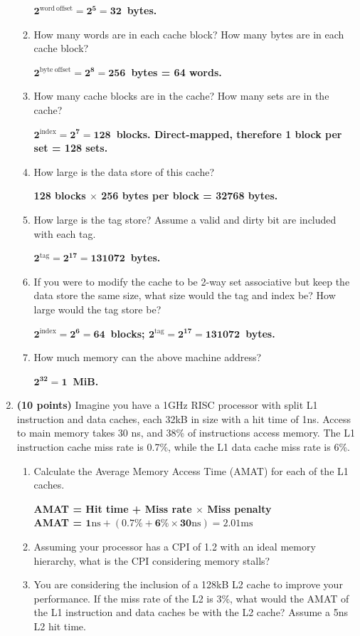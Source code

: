 \documentclass{article}
\begin{document}
\begin{enumerate}
\begin{enumerate}
\textbf{$\bm{2^{\mathrm{word\ offset}}=2^5=32}$\ bytes.}
\item How many words are in each cache block? How many bytes are in each cache block?\par
\textbf{$\bm{2^{\mathrm{byte\ offset}}=2^8=256}$\ bytes = 64 words.}
\item How many cache blocks are in the cache? How many sets are in the cache?\par
\textbf{$\bm{2^{\mathrm{index}}=2^{7}=128}$\ blocks. Direct-mapped, therefore 1 block per set = 128 sets.}
\item How large is the data store of this cache?\par
\textbf{128 blocks $\times$ 256 bytes per block = 32768 bytes.}
\item How large is the tag store? Assume a valid and dirty bit are included with each tag.\par
\textbf{$\bm{2^{\mathrm{tag}}=2^{17}=131072}$\ bytes.}
\item If you were to modify the cache to be 2-way set associative but keep the data store the same size, what size would the tag and index be? How large would the tag store be?\par
\textbf{$\bm{2^{\mathrm{index}}=2^{6}=64}$\ blocks; $\bm{2^{\mathrm{tag}}=2^{17}=131072}$\ bytes.}
\item How much memory can the above machine address?\par
\textbf{$\bm{2^{32}=1}$\ MiB.}
\end{enumerate}
\item \textbf{(10 points)} Imagine you have a 1GHz RISC processor with split L1 instruction and data caches, each 32kB in size with a hit time of 1ns. Access to main memory takes 30 ns, and 38\% of instructions access memory. The L1 instruction cache miss rate is 0.7\%, while the L1 data cache miss rate is 6\%.
\begin{enumerate}
\item Calculate the Average Memory Access Time (AMAT) for each of the L1 caches.\par
\textbf{AMAT = Hit time + Miss rate $\bm{\times}$ Miss penalty\\ AMAT = $\bm{1\mathrm{ns} + (0.7\%+6\% \times 30\mathrm{ns})=2.01\mathrm{ms}}$}
    \item Assuming your processor has a CPI of 1.2 with an ideal memory hierarchy, what is the CPI considering memory stalls?\par
    \textbf{}
    \item You are considering the inclusion of a 128kB L2 cache to improve your performance. If the miss rate of the L2 is 3\%, what would the AMAT of the L1 instruction and data caches be with the L2 cache? Assume a 5ns L2 hit time.\par

\end{enumerate}
\end{enumerate}
\end{document}
